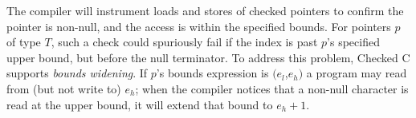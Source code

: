 %
%
%
%
%
%

The \checkedc compiler will instrument loads and stores of checked
pointers to confirm the pointer is non-null, and the access is within
the specified bounds. For pointers $p$ of type
$T$\code{>}, such a check could spuriously fail if
the index is past $p$'s specified upper bound, but before the null
terminator. To address this problem, Checked C supports \emph{bounds
  widening}.
If $p$'s bounds expression is $(e_l$,$e_h)$ a program may read from (but not
write to) $e_h$; when the compiler notices that a non-null character
is read at the upper bound, it will extend that bound to $e_h+1$.


